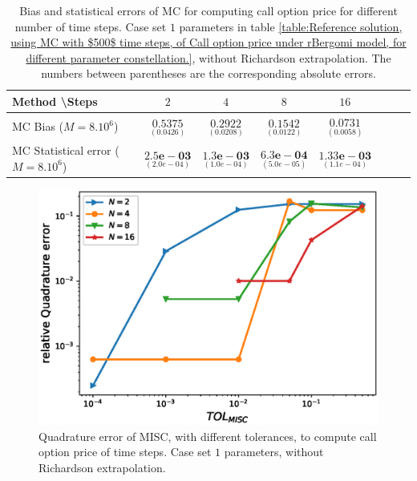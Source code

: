 \FloatBarrier
\begin{table}[!h]
	\centering
	\begin{tabular}{l*{6}{c}r}
		Method \textbackslash  Steps            & $2$ & $4$ & $8$ & $16$  \\
		\hline
		MC Bias ($M=8.10^6$)   & $\underset{(0.0426)}{\mathbf{0.5375
		}}$  & $\underset{ (  0.0208)}{\mathbf{0.2922}}$  & $\underset{(  0.0122)}{\mathbf{0.1542}}$ & $\underset{( 0.0058)}{\mathbf{0.0731}}$  \\	
		
		MC Statistical error ($M=8.10^6$)  & $\underset{( 2.0e-04)}{\mathbf{2.5e-03}}$  & $\underset{(  1.0e-04)}{\mathbf{1.3e-03}}$  & $\underset{(  5.0e-05)}{\mathbf{6.3e-04}}$ & $\underset{(  1.1e-04)}{\mathbf{1.33e-03}}$ \\	
	
		\hline
	\end{tabular}
	\caption{Bias and statistical errors of MC  for computing call option price  for different number of time steps. Case set $1$ parameters in table \ref{table:Reference solution, using MC with $500$ time steps, of Call option price under rBergomi model, for different parameter constellation.}, without Richardson extrapolation. The numbers between parentheses are the corresponding absolute errors.}
	\label{Bias and Statistical errors of MC ($M=10^6$)  for computing Call option price  for different number of time steps. Case set $2$ parameters, without Richardson extrapolation. The numbers between parentheses are the corresponding absolute errors.}
\end{table}



\FloatBarrier
 
\begin{figure}[h!]
	\centering
	\includegraphics[width=0.35\linewidth]{./figures/rBergomi_MISC_quadratre_error/vs_TOL/set2/relative_quad_error_wrt_MISC_TOL_set2_non_rich_linear}
	
	
	\caption{Quadrature error of MISC, with different tolerances, to compute call option price  of time steps. Case  set $1$ parameters, without Richardson extrapolation.}
	\label{fig:Quadrature_error_set2_linear}
\end{figure}

